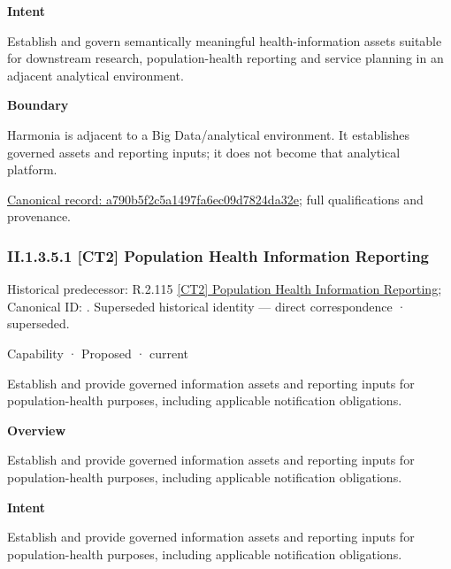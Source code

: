 \textbf{Intent}



Establish and govern semantically meaningful health-information assets suitable for downstream research, population-health reporting and service planning in an adjacent analytical environment.



\textbf{Boundary}



Harmonia is adjacent to a Big Data/analytical environment. It establishes governed assets and reporting inputs; it does not become that analytical platform.


{\footnotesize \href{../../../../../../../continuum/strategy/capability/a790b5f2c5a1497fa6ec09d7824da32e.md}{Canonical record: a790b5f2c5a1497fa6ec09d7824da32e}; full qualifications and provenance.}\par
\subsubsection*{II.1.3.5.1 [CT2] Population Health Information Reporting}
\label{navigation:II.1.3.5.1}

{\small Historical predecessor: R.2.115 \hyperref[element:ced472b2d1a54016878ee541de969d9b]{[CT2] Population Health Information Reporting}; Canonical ID: \texttt{}. Superseded historical identity — direct correspondence · superseded.}\par
\label{element:2135b45eab034370b0063b20e821985d}
{\small Capability · Proposed · current}\par

Establish and provide governed information assets and reporting inputs for population-health purposes, including applicable notification obligations.



\textbf{Overview}



Establish and provide governed information assets and reporting inputs for population-health purposes, including applicable notification obligations.



\textbf{Intent}



Establish and provide governed information assets and reporting inputs for population-health purposes, including applicable notification obligations.



